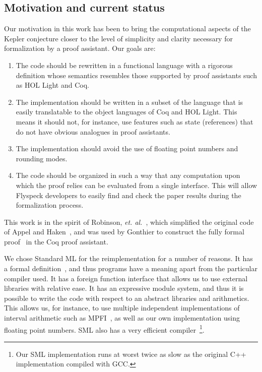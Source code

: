 \documentclass[11pt]{amsart}
\begin{document}



\subsection*{Motivation and current status}
\label{sec:sean}

Our motivation in this work has been to bring the computational aspects of
the Kepler conjecture closer to the level of simplicity and clarity
necessary for formalization by a proof assistant. Our goals are:

\begin{enumerate}
\item The code should be rewritten in a functional language with a
  rigorous definition whose semantics resembles those supported by
  proof assistants such as HOL Light and Coq.
\item The implementation should be written in a subset of the language
  that is easily translatable to the object languages of Coq and HOL
  Light. This means it should not, for instance, use features such as state
  (references) that do not have obvious analogues in proof assistants.
\item The implementation should  avoid the use of floating
  point numbers and rounding modes.
\item The code should be organized in such a way that any
  computation upon which the proof relies can be evaluated from a single
  interface.  This will allow Flyspeck developers to easily find and
  check the paper results during the formalization process.
\end{enumerate} 

\noindent This
work is in the spirit of Robinson, \textit{et.
al.}~\cite{Robertson:1997:JCTB}, which simplified the original code of
Appel and Haken~\cite{Appel:1986:FourColor}, and was used by Gonthier to
construct the fully formal proof~\cite{gonthier:2008:formal} in the
Coq proof assistant. 

We chose Standard ML for the reimplementation for a number of reasons.
It has a formal definition~\cite{Milner:1990:SML}, and thus programs
have a meaning apart from the particular compiler used. It has a
foreign function interface that allows us to use external libraries
with relative ease. It has an expressive module system, and thus it is
possible to write the code with respect to an abstract libraries and
arithmetics. This allows us, for instance, to use multiple independent
implementations of interval arithmetic such as
MPFI~\cite{Revol:2005:MPFI}, as well as our own implementation using
floating point numbers. SML also has a very efficient
compiler~\cite{website:MLton}\footnote{Our SML implementation runs at
worst twice as slow as the original C++ implementation compiled with GCC.}.
\end{document}
